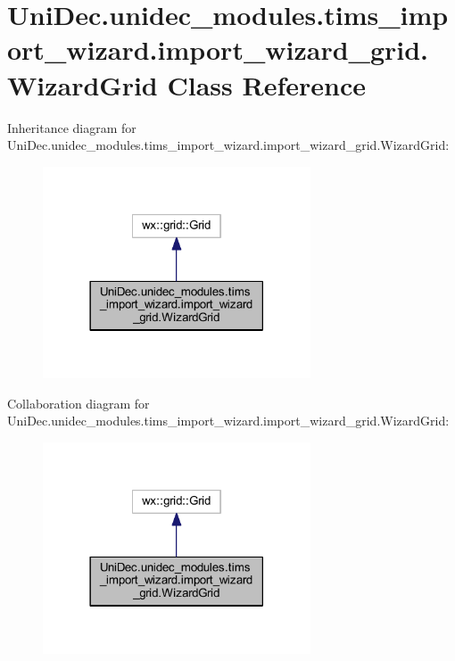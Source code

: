 \hypertarget{class_uni_dec_1_1unidec__modules_1_1tims__import__wizard_1_1import__wizard__grid_1_1_wizard_grid}{}\section{Uni\+Dec.\+unidec\+\_\+modules.\+tims\+\_\+import\+\_\+wizard.\+import\+\_\+wizard\+\_\+grid.\+Wizard\+Grid Class Reference}
\label{class_uni_dec_1_1unidec__modules_1_1tims__import__wizard_1_1import__wizard__grid_1_1_wizard_grid}


Inheritance diagram for Uni\+Dec.\+unidec\+\_\+modules.\+tims\+\_\+import\+\_\+wizard.\+import\+\_\+wizard\+\_\+grid.\+Wizard\+Grid\+:\nopagebreak
\begin{figure}[H]
\begin{center}
\leavevmode
\includegraphics[width=225pt]{class_uni_dec_1_1unidec__modules_1_1tims__import__wizard_1_1import__wizard__grid_1_1_wizard_grid__inherit__graph}
\end{center}
\end{figure}


Collaboration diagram for Uni\+Dec.\+unidec\+\_\+modules.\+tims\+\_\+import\+\_\+wizard.\+import\+\_\+wizard\+\_\+grid.\+Wizard\+Grid\+:\nopagebreak
\begin{figure}[H]
\begin{center}
\leavevmode
\includegraphics[width=225pt]{class_uni_dec_1_1unidec__modules_1_1tims__import__wizard_1_1import__wizard__grid_1_1_wizard_grid__coll__graph}
\end{center}
\end{figure}
